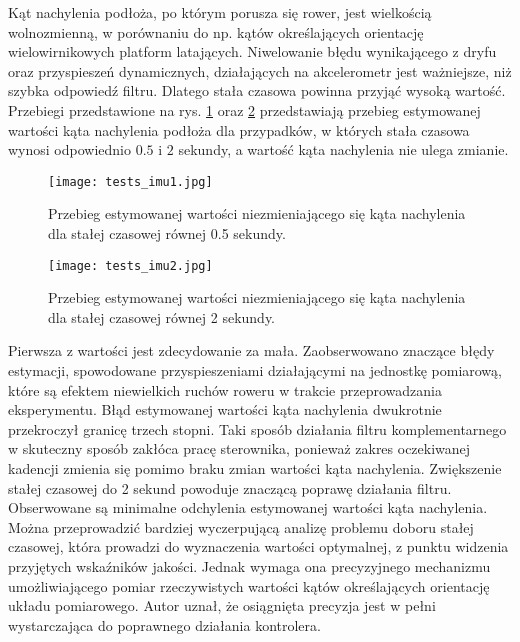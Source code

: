 Kąt nachylenia podłoża, po którym porusza się rower, jest wielkością wolnozmienną, w porównaniu do np. kątów określających orientację wielowirnikowych platform latających. Niwelowanie błędu wynikającego z dryfu oraz przyspieszeń dynamicznych, działających na akcelerometr jest ważniejsze, niż szybka odpowiedź filtru. Dlatego stała czasowa powinna przyjąć wysoką wartość. Przebiegi przedstawione na rys. \ref{fig:tests_imu1} oraz \ref{fig:tests_imu2} przedstawiają przebieg estymowanej wartości kąta nachylenia podłoża dla przypadków, w których stała czasowa wynosi odpowiednio $0.5$ i $2$ sekundy, a wartość kąta nachylenia nie ulega zmianie.
\begin{figure}[h]
    \centering
    \texttt{[image: tests\_imu1.jpg]}
    \caption{Przebieg estymowanej wartości niezmieniającego się kąta nachylenia dla stałej czasowej równej 0.5 sekundy.}
    \label{fig:tests_imu1}
\end{figure}

\begin{figure}[h]
    \centering
    \texttt{[image: tests\_imu2.jpg]}
    \caption{Przebieg estymowanej wartości niezmieniającego się kąta nachylenia dla stałej czasowej równej 2 sekundy.}
    \label{fig:tests_imu2}
\end{figure}
Pierwsza z wartości jest zdecydowanie za mała. Zaobserwowano znaczące błędy estymacji, spowodowane  przyspieszeniami działającymi na jednostkę pomiarową, które są efektem niewielkich ruchów roweru w trakcie przeprowadzania eksperymentu. Błąd estymowanej wartości kąta nachylenia dwukrotnie przekroczył granicę trzech stopni. Taki sposób działania filtru komplementarnego w skuteczny sposób zakłóca pracę sterownika, ponieważ zakres oczekiwanej kadencji zmienia się pomimo braku zmian wartości kąta nachylenia. Zwiększenie stałej czasowej do 2 sekund powoduje znaczącą poprawę działania filtru. Obserwowane są minimalne odchylenia estymowanej wartości kąta nachylenia. Można przeprowadzić bardziej wyczerpującą analizę problemu doboru stałej czasowej, która prowadzi do wyznaczenia wartości optymalnej, z punktu widzenia przyjętych wskaźników jakości. Jednak wymaga ona precyzyjnego mechanizmu umożliwiającego pomiar rzeczywistych wartości kątów określających orientację układu pomiarowego. Autor uznał, że osiągnięta precyzja jest w pełni wystarczająca do poprawnego działania kontrolera.



